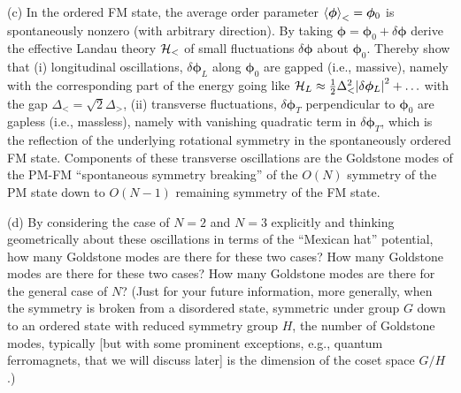 \documentclass[12pt]{article}
\begin{document}
\begin{problem}{4}
(c) In the ordered FM state, the average order parameter
$\expval{\bm\phi}_<=\bm\phi_0$ is spontaneously nonzero (with arbitrary
direction). By taking $\bm\phi=\bm\phi_0+\delta\bm\phi$ derive the effective
Landau theory $\mathcal{H}_<$ of small fluctuations $\delta\bm\phi$ about $\bm\phi_0$.
Thereby show that (i) longitudinal oscillations, $\delta\bm\phi_L$ along
$\bm\phi_0$ are gapped (i.e., massive), namely with the corresponding part of
the energy going like
$\mathcal{H}_L\approx\frac12\Delta_<^2\abs{\delta\bm\phi_L}^2+\hdots$ with the gap
$\Delta_<=\sqrt2\Delta_>$, (ii) transverse fluctuations, $\delta\bm\phi_T$
perpendicular to $\bm\phi_0$ are gapless (i.e., massless), namely with vanishing
quadratic term in $\delta\bm\phi_T$, which is the reflection of the underlying
rotational symmetry in the spontaneously ordered FM state. Components of these
transverse oscillations are the Goldstone modes of the PM-FM ``spontaneous
symmetry breaking'' of the $O(N)$ symmetry of the PM state down to $O(N-1)$
remaining symmetry of the FM state.

(d) By considering the case of $N=2$ and $N=3$ explicitly and thinking
geometrically about these oscillations in terms of the ``Mexican hat''
potential, how many Goldstone modes are there for these two cases? How many
Goldstone modes are there for these two cases? How many Goldstone modes are
there for the general case of $N$? (Just for your future information, more
generally, when the symmetry is broken from a disordered state, symmetric under
group $G$ down to an ordered state with reduced symmetry group $H$, the number
of Goldstone modes, typically [but with some prominent exceptions, e.g.,
quantum ferromagnets, that we will discuss later] is the dimension of the coset
space $G/H$.)
\begin{solution}
\end{solution}
\end{problem}
\newpage
\end{document}
